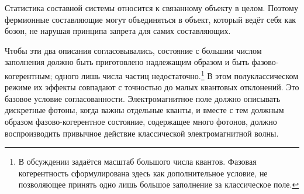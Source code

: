 Статистика составной системы относится к связанному объекту в целом. Поэтому фермионные составляющие могут объединяться в объект, который ведёт себя как бозон, не нарушая принципа запрета для самих составляющих.

\begin{classroomqa}
\end{classroomqa}

Чтобы эти два описания согласовывались, состояние с большим числом заполнения должно быть приготовлено надлежащим образом и быть фазово-когерентным; одного лишь числа частиц недостаточно.\footnote{В обсуждении задаётся масштаб большого числа квантов. Фазовая когерентность сформулирована здесь как дополнительное условие, не позволяющее принять одно лишь большое заполнение за классическое поле.} В этом полуклассическом режиме их эффекты совпадают с точностью до малых квантовых отклонений. Это базовое условие согласованности. Электромагнитное поле должно описывать дискретные фотоны, когда важны отдельные кванты, и вместе с тем должным образом фазово-когерентное состояние, содержащее много фотонов, должно воспроизводить привычное действие классической электромагнитной волны.
